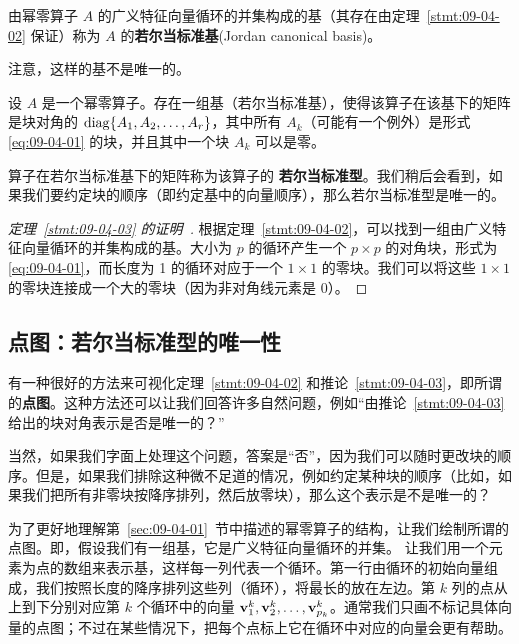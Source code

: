 \begin{definition*}
由幂零算子 $A$ 的广义特征向量循环的并集构成的基（其存在由定理~\ref{stmt:09-04-02} 保证）称为 $A$ 的\textbf{若尔当标准基}(Jordan canonical basis)。
\end{definition*}

注意，这样的基不是唯一的。

\begin{corollary}\label{stmt:09-04-03}
设 $A$ 是一个幂零算子。存在一组基（若尔当标准基），使得该算子在该基下的矩阵是块对角的 $\operatorname{diag}\{A_1, A_2, \dots, A_r\}$，其中所有 $A_k$（可能有一个例外）是形式 \eqref{eq:09-04-01} 的块，并且其中一个块 $A_k$ 可以是零。
\end{corollary}

算子在若尔当标准基下的矩阵称为该算子的 \textbf{若尔当标准型}。我们稍后会看到，如果我们要约定块的顺序（即约定基中的向量顺序），那么若尔当标准型是唯一的。

\begin{proof}[\normalfont\heiti 定理~\ref{stmt:09-04-03} 的证明~\nopunct]
根据定理~\ref{stmt:09-04-02}，可以找到一组由广义特征向量循环的并集构成的基。大小为 $p$ 的循环产生一个 $p \times p$ 的对角块，形式为 \eqref{eq:09-04-01}，而长度为 1 的循环对应于一个 $1 \times 1$ 的零块。我们可以将这些 $1 \times 1$ 的零块连接成一个大的零块（因为非对角线元素是 0）。\end{proof}

\subsection{点图：若尔当标准型的唯一性}\label{sec:09-04-03}

有一种很好的方法来可视化定理~\ref{stmt:09-04-02} 和推论~\ref{stmt:09-04-03}，即所谓的\textbf{点图}。这种方法还可以让我们回答许多自然问题，例如“由推论~\ref{stmt:09-04-03} 给出的块对角表示是否是唯一的？”

当然，如果我们字面上处理这个问题，答案是“否”，因为我们可以随时更改块的顺序。但是，如果我们排除这种微不足道的情况，例如约定某种块的顺序（比如，如果我们把所有非零块按降序排列，然后放零块），那么这个表示是不是唯一的？

为了更好地理解第~\ref{sec:09-04-01}~节中描述的幂零算子的结构，让我们绘制所谓的点图。即，假设我们有一组基，它是广义特征向量循环的并集。
让我们用一个元素为点的数组来表示基，这样每一列代表一个循环。第一行由循环的初始向量组成，我们按照长度的降序排列这些列（循环），将最长的放在左边。第 $k$ 列的点从上到下分别对应第 $k$ 个循环中的向量 $\mathbf{v}_1^k, \mathbf{v}_2^k, \dots, \mathbf{v}_{p_k}^k$。通常我们只画不标记具体向量的点图；不过在某些情况下，把每个点标上它在循环中对应的向量会更有帮助。

